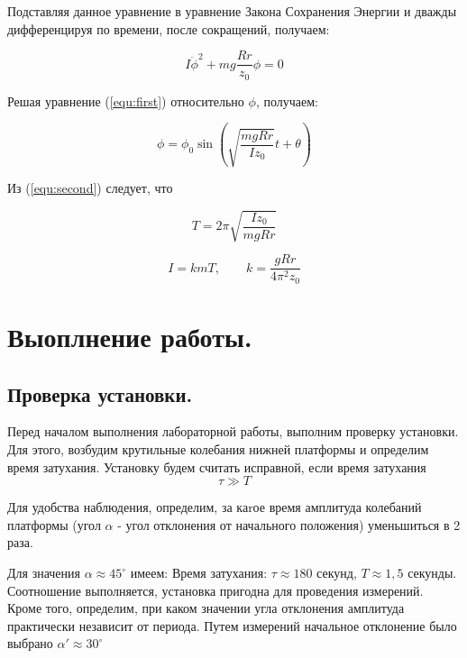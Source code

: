 \documentclass[12pt,a4paper]{article}
\begin{document}
		Подставляя данное уравнение в уравнение Закона Сохранения Энергии и дважды дифференцируя по 				времени, после сокращений, получаем:

	\begin{equation}
		 I\ddot{\phi}^2 + mg\frac{Rr}{z_{0}}\phi = 0
		 \label{equ:first}
	\end{equation}


		Решая уравнение (\ref{equ:first}) относительно $\phi$, получаем:


	\begin{equation}
		\phi = \phi_{0}\sin\left(\sqrt{\frac{mgRr}{Iz_{0}}}t + \theta\right)
		\label{equ:second}
	\end{equation}


	Из (\ref{equ:second}) следует, что

	\begin{equation}
		T = 2\pi\sqrt{\frac{Iz_{0}}{mgRr}}
	\end{equation}

	\begin{equation}
		I = kmT, \qquad k = \frac{gRr}{4\pi^2z_{0}}
		\label{equ:four}
	\end{equation}

	\newpage

\section{Выоплнение работы.}

	\subsection{Проверка установки.}

		\qquad  Перед началом выполнения лабораторной работы, выполним проверку установки. Для этого, возбудим крутильные колебания нижней платформы и определим время затухания. Установку будем считать исправной, если время затухания $$\tau \gg T$$

		Для удобства наблюдения, определим, за каrое время амплитуда колебаний платформы (угол $\alpha$ - угол отклонения от начального положения) уменьшиться в 2 раза.

		Для значения $\alpha \approx 45^{\circ}$ имеем: Время затухания: $\tau \approx 180$ секунд, $T \approx 1,5$ секунды. Соотношение выполняется, установка пригодна для проведения измерений. Кроме того, определим, при каком значении угла отклонения амплитуда практически независит от периода. Путем измерений начальное отклонение было выбрано $\alpha' \approx 30^{\circ}$
\end{document}

